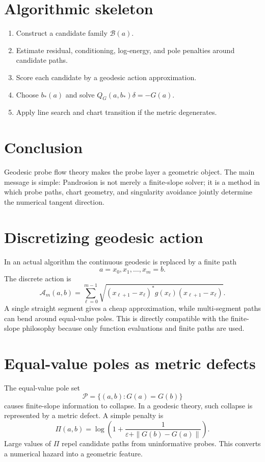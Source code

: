 \documentclass[11pt]{article}
\begin{document}
\section{Algorithmic skeleton}
\begin{enumerate}[leftmargin=2em]
\item Construct a candidate family $\mathcal B(a)$.
\item Estimate residual, conditioning, log-energy, and pole penalties around candidate paths.
\item Score each candidate by a geodesic action approximation.
\item Choose $b_*(a)$ and solve $Q_G(a,b_*)\delta=-G(a)$.
\item Apply line search and chart transition if the metric degenerates.
\end{enumerate}

\section{Conclusion}
Geodesic probe flow theory makes the probe layer a geometric object.  The main message is simple: Pandrosion is not merely a finite-slope solver; it is a method in which probe paths, chart geometry, and singularity avoidance jointly determine the numerical tangent direction.


\section{Discretizing geodesic action}
In an actual algorithm the continuous geodesic is replaced by a finite path
\[
        a=x_0,x_1,\ldots,x_m=b.
\]
The discrete action is
\[
        \mathcal A_m(a,b)=\sum_{\ell=0}^{m-1}\sqrt{(x_{\ell+1}-x_\ell)^*g(x_\ell)(x_{\ell+1}-x_\ell)}.
\]
A single straight segment gives a cheap approximation, while multi-segment paths can bend around equal-value poles.  This is directly compatible with the finite-slope philosophy because only function evaluations and finite paths are used.

\section{Equal-value poles as metric defects}
The equal-value pole set
\[
        \mathcal P=\{(a,b):G(a)=G(b)\}
\]
causes finite-slope information to collapse.  In a geodesic theory, such collapse is represented by a metric defect.  A simple penalty is
\[
        \Pi(a,b)=\log\left(1+\frac{1}{\varepsilon+\|G(b)-G(a)\|}\right).
\]
Large values of $\Pi$ repel candidate paths from uninformative probes.  This converts a numerical hazard into a geometric feature.
\end{document}
